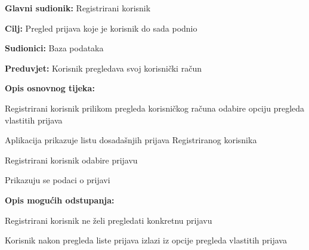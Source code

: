 				
				\noindent {}
				\begin{packed_item}
					
					\item \textbf{Glavni sudionik:} Registrirani korisnik
					\item  \textbf{Cilj:} Pregled prijava koje je korisnik do sada podnio
					\item  \textbf{Sudionici:} Baza podataka
					\item  \textbf{Preduvjet:} Korisnik pregledava svoj korisnički račun
					
					\item  \textbf{Opis osnovnog tijeka:}
					\item[] \begin{packed_enum}
						\item Registrirani korisnik prilikom pregleda korisničkog računa odabire opciju pregleda vlastitih prijava
						\item Aplikacija prikazuje listu dosadašnjih prijava Registriranog korisnika
						\item Registrirani korisnik odabire prijavu
						\item Prikazuju se podaci o prijavi
					\end{packed_enum}
					
					\item  \textbf{Opis mogućih odstupanja:}
					\item[] \begin{packed_item}						
						\item[3.a] Registrirani korisnik ne želi pregledati konkretnu prijavu
						\item[] \begin{packed_enum}
							\item Korisnik nakon pregleda liste prijava izlazi iz opcije pregleda vlastitih prijava
						\end{packed_enum}
					\end{packed_item}
				\end{packed_item}
				
